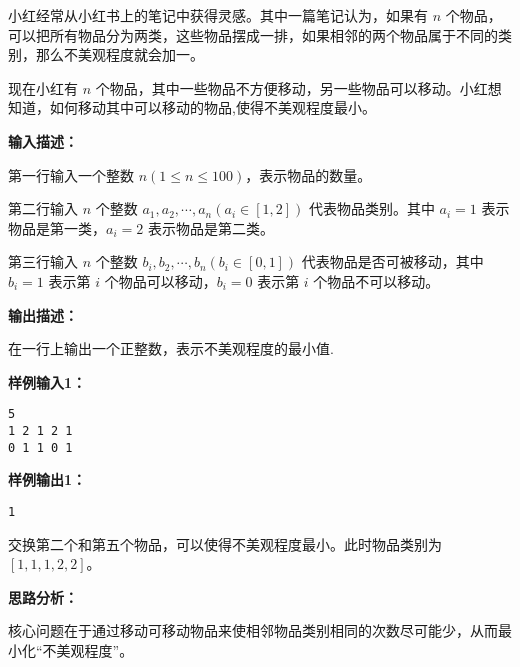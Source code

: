 \documentclass[a4paper]{ctexart}
\begin{document}
小红经常从小红书上的笔记中获得灵感。其中一篇笔记认为，如果有 $n$ 个物品，可以把所有物品分为两类，这些物品摆成一排，如果相邻的两个物品属于不同的类别，那么不美观程度就会加一。
	
现在小红有 $n$ 个物品，其中一些物品不方便移动，另一些物品可以移动。小红想知道，如何移动其中可以移动的物品,使得不美观程度最小。
	
\noindent\textbf{输入描述：}
	
第一行输入一个整数 $n (1 \leq n \leq 100)$，表示物品的数量。

第二行输入 $n$ 个整数 $a_1,a_2,\cdots,a_n (a_i \in [1,2])$ 代表物品类别。其中 $a_i = 1$ 表示物品是第一类，$a_i = 2$ 表示物品是第二类。

第三行输入 $n$ 个整数 $b_i,b_2,\cdots,b_n (b_i \in [0,1])$ 代表物品是否可被移动，其中 $b_i = 1$ 表示第 $i$ 个物品可以移动，$b_i = 0$ 表示第 $i$ 个物品不可以移动。
	
\noindent\textbf{输出描述：} 

在一行上输出一个正整数，表示不美观程度的最小值.
	
\noindent\textbf{样例输入1：}
	
\lstset{numbers=none}
\begin{lstlisting}
5
1 2 1 2 1
0 1 1 0 1
\end{lstlisting}
\lstset{numbers=left}
	
\noindent\textbf{样例输出1：}
\lstset{numbers=none}
\begin{lstlisting}
1
\end{lstlisting}
\lstset{numbers=left}
	
\noindent 交换第二个和第五个物品，可以使得不美观程度最小。此时物品类别为$[1,1,1,2,2]$。
	
\vspace{10pt}
	
\noindent\textbf{思路分析：}

核心问题在于通过移动可移动物品来使相邻物品类别相同的次数尽可能少，从而最小化“不美观程度”。
\end{document}
